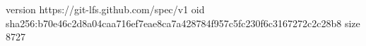 version https://git-lfs.github.com/spec/v1
oid sha256:b70e46c2d8a04caa716ef7eae8ca7a428784f957c5fc230f6c3167272c2c28b8
size 8727
